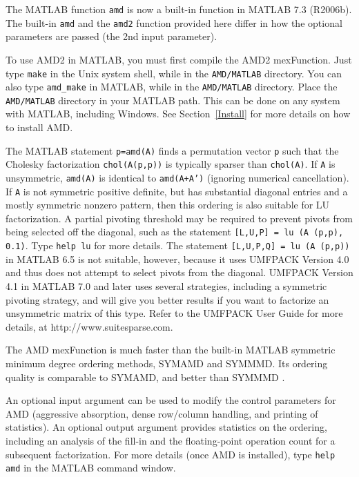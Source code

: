 \documentclass[11pt]{article}
\begin{document}
The MATLAB function {\tt amd} is now a built-in function in MATLAB 7.3
(R2006b).  The built-in {\tt amd} and the {\tt amd2} function provided here
differ in how the optional parameters are passed
(the 2nd input parameter).

To use AMD2 in MATLAB, you must first compile the AMD2 mexFunction.
Just type {\tt make} in the Unix system shell, while in the {\tt AMD/MATLAB}
directory.  You can also type {\tt amd\_make} in MATLAB, while in the
{\tt AMD/MATLAB} directory.  Place the {\tt AMD/MATLAB} directory in your
MATLAB path.  This can be done on any system with MATLAB, including Windows.
See Section~\ref{Install} for more details on how to install AMD.

The MATLAB statement {\tt p=amd(A)} finds a permutation vector {\tt p} such
that the Cholesky factorization {\tt chol(A(p,p))} is typically sparser than
{\tt chol(A)}.
If {\tt A} is unsymmetric, {\tt amd(A)} is identical to {\tt amd(A+A')}
(ignoring numerical cancellation).
If {\tt A} is not symmetric positive definite,
but has substantial diagonal entries and a mostly symmetric nonzero pattern,
then this ordering is also suitable for LU factorization.  A partial pivoting
threshold may be required to prevent pivots from being selected off the
diagonal, such as the statement {\tt [L,U,P] = lu (A (p,p), 0.1)}.
Type {\tt help lu} for more details.
The statement {\tt [L,U,P,Q] = lu (A (p,p))} in MATLAB 6.5 is
not suitable, however, because it uses UMFPACK Version 4.0 and thus
does not attempt to select pivots from the diagonal.
UMFPACK Version 4.1 in MATLAB 7.0 and later
uses several strategies, including a symmetric pivoting strategy, and
will give you better results if you want to factorize an unsymmetric matrix
of this type.  Refer to the UMFPACK User Guide for more details, at
http://www.suitesparse.com.

The AMD mexFunction is much faster than the built-in MATLAB symmetric minimum
degree ordering methods, SYMAMD and SYMMMD.  Its ordering quality is
comparable to SYMAMD, and better than SYMMMD
\cite{DavisGilbertLarimoreNg04}.

An optional input argument can be used to modify the control parameters for
AMD (aggressive absorption, dense row/column handling, and printing of
statistics).  An optional output
argument provides statistics on the ordering, including an analysis of the
fill-in and the floating-point operation count for a subsequent factorization.
For more details (once AMD is installed),
type {\tt help amd} in the MATLAB command window.
\end{document}
